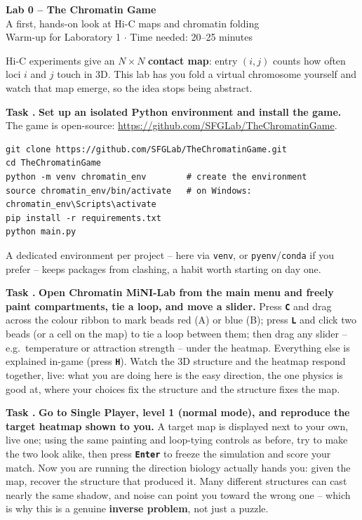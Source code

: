 \documentclass[11pt]{article}
\newcommand{\key}[1]{\texttt{\textbf{#1}}}
\newcounter{tasknum}
\newcommand{\task}[1]{%
	\stepcounter{tasknum}%
	\par\vspace{8pt}\noindent%
	{\color{accent}\textbf{Task \thetasknum.}} \textbf{#1} }
\begin{document}
\thispagestyle{fancy}

\begin{center}
	{\LARGE\bfseries\color{accent} Lab 0 -- The Chromatin Game}\\[2pt]
	{\large A first, hands-on look at Hi-C maps and chromatin folding}\\[2pt]
	{\small Warm-up for Laboratory 1 \quad $\cdot$ \quad Time needed: 20--25 minutes}
\end{center}

\vspace{3pt}
\noindent
Hi-C experiments give an $N\times N$ \textbf{contact map}: entry $(i,j)$ counts how
often loci $i$ and $j$ touch in 3D. This lab has you fold a virtual chromosome
yourself and watch that map emerge, so the idea stops being abstract.

\task{Set up an isolated Python environment and install the game.}%
The game is open-source: \url{https://github.com/SFGLab/TheChromatinGame}.
\begin{center}
\begin{minipage}{0.95\linewidth}
\footnotesize
\begin{verbatim}
git clone https://github.com/SFGLab/TheChromatinGame.git
cd TheChromatinGame
python -m venv chromatin_env        # create the environment
source chromatin_env/bin/activate   # on Windows: chromatin_env\Scripts\activate
pip install -r requirements.txt
python main.py
\end{verbatim}
\end{minipage}
\end{center}
\noindent A dedicated environment per project -- here via \texttt{venv}, or
\texttt{pyenv}/\texttt{conda} if you prefer -- keeps packages from clashing,
a habit worth starting on day one.

\task{Open \textbf{Chromatin MiNI-Lab} from the main menu and freely paint
compartments, tie a loop, and move a slider.}%
Press \key{C} and drag across the colour ribbon to mark beads red (A) or blue
(B); press \key{L} and click two beads (or a cell on the map) to tie a loop
between them; then drag any slider -- e.g.\ temperature or attraction strength
-- under the heatmap. Everything else is explained in-game (press \key{H}).
Watch the 3D structure and the heatmap respond together, live: what you are
doing here is the easy direction, the one physics is good at, where your
choices fix the structure and the structure fixes the map.

\task{Go to \textbf{Single Player}, level 1 (normal mode), and reproduce the
target heatmap shown to you.}%
A target map is displayed next to your own, live one; using the same painting
and loop-tying controls as before, try to make the two look alike, then press
\key{Enter} to freeze the simulation and score your match. Now you are running
the direction biology actually hands you: given the map, recover the structure
that produced it. Many different structures can cast nearly the same shadow,
and noise can point you toward the wrong one -- which is why this is a genuine
\textbf{inverse problem}, not just a puzzle.
\end{document}
